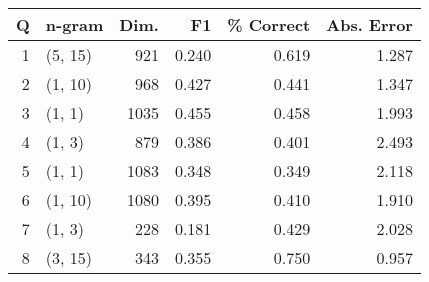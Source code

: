 \begin{tabular}{rlrrrr}
\toprule
 Q &    n-gram &  Dim. &     F1 &  \% Correct &  Abs. Error \\
\midrule
        1 &  (5, 15) &   921 &  0.240 &      0.619 &           1.287 \\
        2 &  (1, 10) &   968 &  0.427 &      0.441 &           1.347 \\
        3 &   (1, 1) &  1035 &  0.455 &      0.458 &           1.993 \\
        4 &   (1, 3) &   879 &  0.386 &      0.401 &           2.493 \\
        5 &   (1, 1) &  1083 &  0.348 &      0.349 &           2.118 \\
        6 &  (1, 10) &  1080 &  0.395 &      0.410 &           1.910 \\
        7 &   (1, 3) &   228 &  0.181 &      0.429 &           2.028 \\
        8 &  (3, 15) &   343 &  0.355 &      0.750 &           0.957 \\
\bottomrule
\end{tabular}

